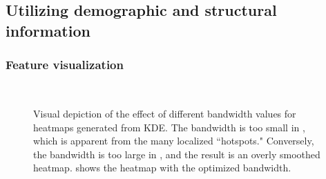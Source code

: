 \documentclass{svjour3}
\begin{document}
  
  \subsection{Utilizing demographic and structural information}
  
  
  
  \subsubsection{Feature visualization}
  \begin{figure}[!htb]
       \begin{center}
            \\ %
      \end{center}
      \caption{ Visual depiction of the effect of different bandwidth values for heatmaps generated from KDE. The bandwidth is too small in \protect{}, which is apparent from the many localized ``hotspots."  Conversely, the bandwidth is too large in \protect{}, and the result is an overly smoothed heatmap. \protect{} shows the heatmap with the optimized bandwidth.}
     \label{fig:sociodemographic}
  \end{figure}
  
\end{document}

